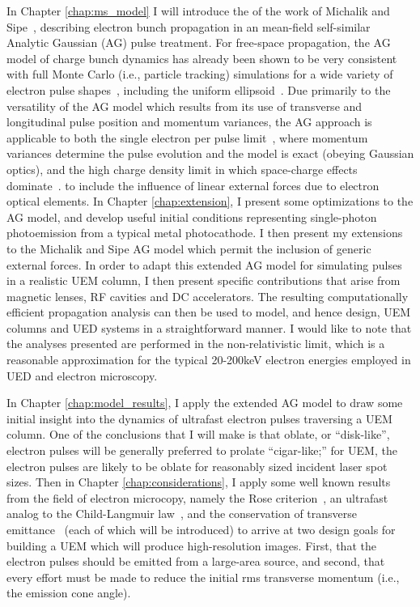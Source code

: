 In Chapter \ref{chap:ms_model} I will introduce the of the work of Michalik and Sipe~\cite{michalik_analytic_2006,michalik_erratum:_2008}, describing electron bunch propagation in an mean-field self-similar Analytic Gaussian (AG) pulse treatment.
For free-space propagation, the AG model of charge bunch dynamics has already been shown to be very consistent with full Monte Carlo (i.e., particle tracking) simulations for a wide variety of electron pulse shapes~\cite{michalik_analytic_2006,michalik_evolution_2009}, including the uniform ellipsoid~\cite{luiten_how_2004}.
Due primarily to the versatility of the AG model which results from its use of transverse and longitudinal pulse position and momentum variances, the AG approach is applicable to both the single electron per pulse limit~\cite{lobastov_four-dimensional_2005}, where momentum variances determine the pulse evolution and the model is exact (obeying Gaussian optics), and the high charge density limit in which space-charge effects dominate~\cite{luiten_how_2004,siwick_ultrafast_2002,cao_femtosecond_2003}.
 to include the influence of linear external forces due to electron optical elements.
In Chapter \ref{chap:extension}, I present some optimizations to the AG model, and develop useful initial conditions representing single-photon photoemission from a typical metal photocathode.
I then present my extensions to the Michalik and Sipe AG model which permit the inclusion of generic external forces.
In order to adapt this extended AG model for simulating pulses in a realistic UEM column, I then present specific contributions that arise from magnetic lenses, RF cavities and DC accelerators.
The resulting computationally efficient propagation analysis can then be used to model, and hence design, UEM columns and UED systems in a straightforward manner.
I would like to note that the analyses presented are performed in the non-relativistic limit, which is a reasonable approximation for the typical 20-200keV electron energies employed in UED and electron microscopy.

In Chapter \ref{chap:model_results}, I apply the extended AG model to draw some initial insight into the dynamics of ultrafast electron pulses traversing a UEM column.
One of the conclusions that I will make is that oblate, or ``disk-like'', electron pulses will be generally preferred to prolate ``cigar-like;'' for UEM, the electron pulses are likely to be oblate for reasonably sized incident laser spot sizes.
Then in Chapter \ref{chap:considerations}, I apply some well known results from the field of electron microcopy, namely the Rose criterion~\cite{rose_television_1948}, an ultrafast analog to the Child-Langmuir law~\cite{child_discharge_1911,langmuir_effect_1923,valfells_effects_2002}, and the conservation of transverse emittance~\cite{jensen_emittance_2010} (each of which will be introduced) to arrive at two design goals for building a UEM which will produce high-resolution images.
First, that the electron pulses should be emitted from a large-area source, and second, that every effort must be made to reduce the initial rms transverse momentum (i.e., the emission cone angle).

